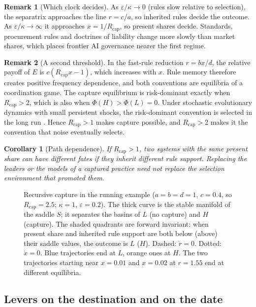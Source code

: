 \documentclass[11pt]{article}
\theoremstyle{plain}
\newtheorem{corollary}{Corollary}
\theoremstyle{definition}
\newtheorem{remark}{Remark}
\newcommand{\Rcap}{R_{\mathrm{cap}}}
\begin{document}
\begin{remark}[Which clock decides]\label{rem:clocks}
As $\varepsilon/\kappa\to0$ (rules slow relative to selection), the separatrix approaches the line $r=c/a$, so inherited rules decide the outcome. As $\varepsilon/\kappa\to\infty$ it approaches $x=1/\Rcap$, so present shares decide. Standards, procurement rules and doctrines of liability change more slowly than market shares, which places frontier AI governance nearer the first regime.
\end{remark}

\begin{remark}[A second threshold]\label{rem:riskdominance}
In the fast-rule reduction $r=bx/d$, the relative payoff of $E$ is $c(\Rcap x-1)$, which increases with $x$. Rule memory therefore creates positive frequency dependence, and both conventions are equilibria of a coordination game. The capture equilibrium is risk-dominant exactly when $\Rcap>2$, which is also when $\Phi(H)>\Phi(L)=0$. Under stochastic evolutionary dynamics with small persistent shocks, the risk-dominant convention is selected in the long run \citep{kandori1993,young1993}. Hence $\Rcap>1$ makes capture possible, and $\Rcap>2$ makes it the convention that noise eventually selects.
\end{remark}

\begin{corollary}[Path dependence]\label{cor:path}
If $\Rcap>1$, two systems with the same present share can have different fates if they inherit different rule support. Replacing the leaders or the models of a captured practice need not replace the selection environment that promoted them.
\end{corollary}

\begin{figure}[t]
\centering

\caption{Recursive capture in the running example ($a=b=d=1$, $c=0.4$, so $\Rcap=2.5$; $\kappa=1$, $\varepsilon=0.2$). The thick curve is the stable manifold of the saddle $S$; it separates the basins of $L$ (no capture) and $H$ (capture). The shaded quadrants are forward invariant: when present share and inherited rule support are both below (above) their saddle values, the outcome is $L$ ($H$). Dashed: $\dot r=0$. Dotted: $\dot x=0$. Blue trajectories end at $L$, orange ones at $H$. The two trajectories starting near $x=0.01$ and $x=0.02$ at $r=1.55$ end at different equilibria.}
\label{fig:phase}
\end{figure}

\subsection{Levers on the destination and on the date}
\end{document}
